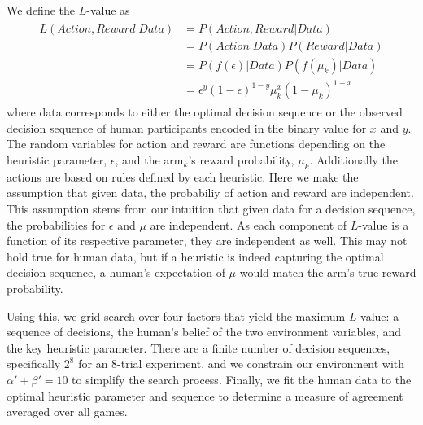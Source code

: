 We define the $L$-value as 
\begin{align}
\begin{split}
	\label{eq:likelihood}
	L(Action,Reward|Data) &= P(Action,Reward|Data) \\
						  &= P(Action|Data) P(Reward|Data) \\
						  &= P(f(\epsilon)|Data) P(f(\mu_k)|Data) \\
						  &= \epsilon^y (1-\epsilon)^{1-y} \mu_k^x (1-\mu_k)^{1-x}
\end{split}
\end{align}
where data corresponds to either the optimal decision sequence or the observed decision sequence of human participants encoded in the binary value for $x$ and $y$. The random variables for action and reward are functions depending on the heuristic parameter, $\epsilon$, and the arm$_k$'s reward probability, $\mu_k$. Additionally the actions are based on rules defined by each heuristic. Here we make the assumption that given data, the probabiliy of action and reward are independent. This assumption stems from our intuition that given data for a decision sequence, the probabilities for $\epsilon$ and $\mu$ are independent. As each component of $L$-value is a function of its respective parameter, they are independent as well. This may not hold true for human data, but if a heuristic is indeed capturing the optimal decision sequence, a human's expectation of $\mu$ would match the arm's true reward probability.

Using this, we grid search over four factors that yield the maximum $L$-value: a sequence of decisions, the human's belief of the two environment variables, and the key heuristic parameter. There are a finite number of decision sequences, specifically $2^8$ for an 8-trial experiment, and we constrain our environment with $\alpha'+\beta'=10$ to simplify the search process. Finally, we fit the human data to the optimal heuristic parameter and sequence to determine a measure of agreement averaged over all games.



